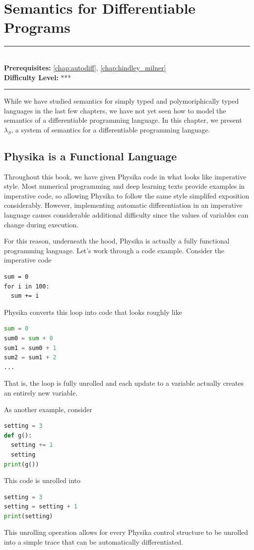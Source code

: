 \documentclass[book.tex]{subfiles}
\begin{document}
\chapter{Semantics for Differentiable Programs}

\label{chap:grammar}
\noindent\rule{11cm}{0.4pt} \\
\textbf{Prerequisites:} \autoref{chap:autodiff}, \autoref{chap:hindley_milner}  \\
\textbf{Difficulty Level:} *** \\
\noindent\rule{11cm}{0.4pt}
\vspace{5mm}

While we have studied semantics for simply typed and polymoriphically typed languages in the last few chapters, we have not yet seen how to model the semantics of a differentiable programming language. In this chapter, we present $\lambda_S$, a system of semantics for a differentiable programming language. 

\section{Physika is a Functional Language}

Throughout this book, we have given Physika code in what looks like imperative style. Most numerical programming and deep learning texts provide examples in imperative code, so allowing Physika to follow the same style simplifed exposition considerably. However, implementing automatic differentiation in an imperative language causes considerable additional difficulty since the values of variables can change during execution.

For this reason, underneath the hood, Physika is actually a fully functional programming language. Let's work through a code example. Consider the imperative code

\begin{lstlisting}
sum = 0
for i in 100:
  sum += i
\end{lstlisting}

Physika converts this loop into code that looks roughly like
\begin{lstlisting}[language=python]
sum = 0
sum0 = sum + 0
sum1 = sum0 + 1
sum2 = sum1 + 2
...
\end{lstlisting}
That is, the loop is fully unrolled and each update to a variable actually creates an entirely new variable.

As another example, consider
\begin{lstlisting}[language=python]
setting = 3
def g():
  setting += 1
  setting
print(g())
\end{lstlisting}
This code is unrolled into
\begin{lstlisting}[language=python]
setting = 3
setting = setting + 1
print(setting)
\end{lstlisting}
This unrolling operation allows for every Physika control structure to be unrolled into a simple trace that can be automatically differentiated.
\end{document}
